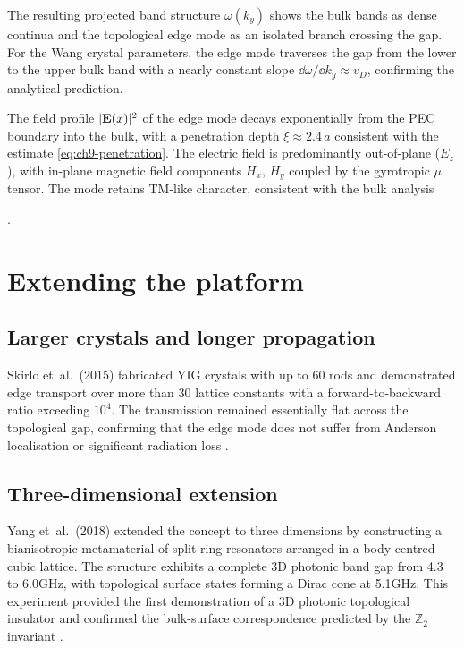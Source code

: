 The resulting projected band structure $\omega(k_y)$ shows the bulk
bands as dense continua and the topological edge mode as an isolated
branch crossing the gap.  For the Wang crystal parameters, the edge
mode traverses the gap from the lower to the upper bulk band with a
nearly constant slope $\dd\omega/\dd k_y\approx v_D$, confirming the
analytical prediction.

The field profile $|\mathbf{E}(x)|^2$ of the edge mode decays
exponentially from the PEC boundary into the bulk, with a penetration
depth $\xi\approx 2.4\,a$ consistent with the estimate
\eqref{eq:ch9-penetration}.  The electric field is predominantly
out-of-plane ($E_z$), with in-plane magnetic field
components $H_x$, $H_y$ coupled by the gyrotropic $\mu$ tensor.
The mode retains TM-like character, consistent with the bulk analysis


\cite{ozawa2018topological,nature2026observation}.

\section{Extending the platform}
\label{sec:ch9-extending}

\subsection{Larger crystals and longer propagation}
\label{sec:ch9-larger}

Skirlo et~al.\ (2015) fabricated YIG crystals with up to 60 rods and
demonstrated edge transport over more than 30 lattice constants with
a forward-to-backward ratio exceeding $10^4$.  The transmission
remained essentially flat across the topological gap, confirming that
the edge mode does not suffer from Anderson localisation or
significant radiation loss \cite{skirlo2015experimental}.

\subsection{Three-dimensional extension}
\label{sec:ch9-3d}

Yang et~al.\ (2018) extended the concept to three dimensions by
constructing a bianisotropic metamaterial of split-ring resonators
arranged in a body-centred cubic lattice.  The structure exhibits a
complete 3D photonic band gap from 4.3 to 6.0\;GHz, with topological
surface states forming a Dirac cone at 5.1\;GHz.  This experiment
provided the first demonstration of a 3D photonic topological
insulator and confirmed the bulk-surface correspondence predicted by
the $\mathbb{Z}_2$ invariant \cite{yang2018realization,price2022roadmap}.

